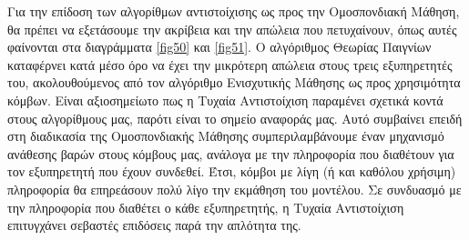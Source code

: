 Για την επίδοση των αλγορίθμων αντιστοίχισης ως προς την Ομοσπονδιακή Μάθηση, θα πρέπει να εξετάσουμε την ακρίβεια και την απώλεια που πετυχαίνουν, όπως αυτές φαίνονται στα διαγράμματα \ref*{fig50} και \ref*{fig51}. Ο αλγόριθμος Θεωρίας Παιγνίων καταφέρνει κατά μέσο όρο να έχει την μικρότερη απώλεια στους τρεις εξυπηρετητές του, ακολουθούμενος από τον αλγόριθμο Ενισχυτικής Μάθησης ως προς χρησιμότητα κόμβων. Είναι αξιοσημείωτο πως η Τυχαία Αντιστοίχιση παραμένει σχετικά κοντά στους αλγορίθμους μας, παρότι είναι το σημείο αναφοράς μας. Αυτό συμβαίνει επειδή στη διαδικασία της Ομοσπονδιακής Μάθησης συμπεριλαμβάνουμε έναν μηχανισμό ανάθεσης βαρών στους κόμβους μας, ανάλογα με την πληροφορία που διαθέτουν για τον εξυπηρετητή που έχουν συνδεθεί. Έτσι, κόμβοι με λίγη (ή και καθόλου χρήσιμη) πληροφορία θα επηρεάσουν πολύ λίγο την εκμάθηση του μοντέλου. Σε συνδυασμό με την πληροφορία που διαθέτει ο κάθε εξυπηρετητής, η Τυχαία Αντιστοίχιση επιτυγχάνει σεβαστές επιδόσεις παρά την απλότητα της. 
